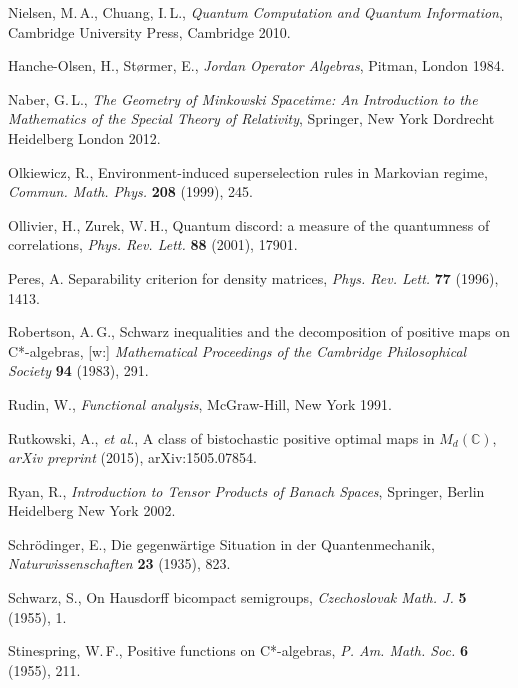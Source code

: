 {\begin{thebibliography}{99}
    Nielsen, M.\,A., Chuang, I.\,L.,
    \emph{Quantum Computation and Quantum Information},
    Cambridge University Press, Cambridge 2010.

    Hanche-Olsen, H., St{\o}rmer, E., \emph{Jordan Operator Algebras},
    Pitman, London 1984.

    Naber, G.\,L.,
    \emph{The Geometry of Minkowski Spacetime: An Introduction to the Mathematics of the Special Theory of Relativity},
    Springer, New York Dordrecht Heidelberg London 2012.

    Olkiewicz, R.,
    Environment-induced superselection rules in Markovian regime,
    \emph{Commun. Math. Phys.} {\bf 208} (1999), 245.

    Ollivier, H., Zurek, W.\,H.,
    Quantum discord: a measure of the quantumness of correlations,
    \emph{Phys. Rev. Lett.} {\bf 88} (2001), 17901.

    Peres, A.
    Separability criterion for density matrices,
    \emph{Phys. Rev. Lett.} {\bf 77} (1996), 1413.

    Robertson, A.\,G.,
    Schwarz inequalities and the decomposition of positive maps on C*-algebras,
    [w:] \emph{Mathematical Proceedings of the Cambridge Philosophical Society}
    {\bf 94} (1983), 291.

    Rudin, W.,
    \emph{Functional analysis},
    McGraw-Hill, New York 1991.

    Rutkowski, A., \emph{et al.},
    A class of bistochastic positive optimal maps in $M_{d}(\mathbb{C})$,
    \emph{arXiv preprint} (2015), arXiv:1505.07854.

    Ryan, R., \emph{Introduction to Tensor Products of Banach Spaces},
    Springer, Berlin Heidelberg New York 2002.

    Schr{\"o}dinger, E.,
    Die gegenw{\"a}rtige Situation in der Quantenmechanik,
    \emph{Naturwissenschaften} {\bf 23} (1935), 823.

    Schwarz, S.,
    On Hausdorff bicompact semigroups,
    \emph{Czechoslovak Math. J.} {\bf 5} (1955), 1.

    Stinespring, W.\,F.,
    Positive functions on C*-algebras,
    \emph{P. Am. Math. Soc.} {\bf 6} (1955), 211.


\end{thebibliography}}
